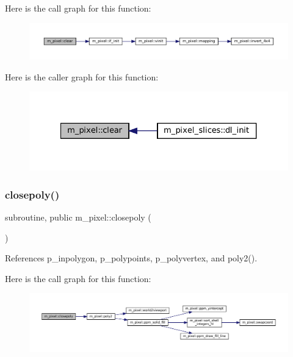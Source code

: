 Here is the call graph for this function\+:
\nopagebreak
\begin{figure}[H]
\begin{center}
\leavevmode
\includegraphics[width=350pt]{namespacem__pixel_af3b81a21a0b2f6b5eddd09c031bd6173_cgraph}
\end{center}
\end{figure}
Here is the caller graph for this function\+:
\nopagebreak
\begin{figure}[H]
\begin{center}
\leavevmode
\includegraphics[width=327pt]{namespacem__pixel_af3b81a21a0b2f6b5eddd09c031bd6173_icgraph}
\end{center}
\end{figure}
\mbox{\label{namespacem__pixel_ab3dc83b63d2ab1bf3f63932abca4245d}} 
\subsubsection{\texorpdfstring{closepoly()}{closepoly()}}
{\footnotesize\ttfamily subroutine, public m\+\_\+pixel\+::closepoly (\begin{DoxyParamCaption}{ }\end{DoxyParamCaption})}



References p\+\_\+inpolygon, p\+\_\+polypoints, p\+\_\+polyvertex, and poly2().

Here is the call graph for this function\+:
\nopagebreak
\begin{figure}[H]
\begin{center}
\leavevmode
\includegraphics[width=350pt]{namespacem__pixel_ab3dc83b63d2ab1bf3f63932abca4245d_cgraph}
\end{center}
\end{figure}
\mbox{\label{namespacem__pixel_a8555eecec7e18106e8167e137cfe8424}} 
